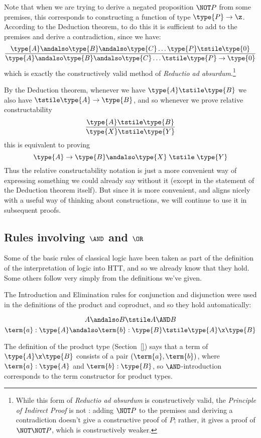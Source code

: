 Note that when we are trying to derive a negated proposition $\NOT P$ from some premises, this corresponds to constructing a function of type $\type{P} \to \z$.  According to the Deduction theorem, to do this it is sufficient to add  to the premises and derive a contradiction, since we have:
\[
\frac
{\type{A}\andalso \type{B}\andalso \type{C} \ldots \type{P} \tstile \type{0}
}
{\type{A}\andalso \type{B}\andalso \type{C} \ldots \tstile \type{P} \to \type{0}
}
\]
which is exactly the constructively valid method of \emph{Reductio ad absurdum}.\footnote{
While this form of \emph{Reductio ad absurdum} is constructively valid,  the \emph{Principle of Indirect Proof} is not
: adding $\NOT P$ to the premises and deriving a contradiction doesn't give a constructive proof of $P$; rather, it gives a proof of $\NOT \NOT P$, which is constructively weaker.
}

By the Deduction theorem, whenever we have 
$\type{A} \tstile \type{B}$ 
we also have 
$\tstile \type{A} \to \type{B}$, and so whenever we prove relative constructability
\[
\frac{\type{A} \tstile \type{B}}
{\type{X} \tstile \type{Y}}
\]
this is equivalent to proving
\[
\type{A} \to \type{B}\andalso \type{X} 
\;\tstile\; 
\type{Y}
\]
Thus the relative constructability notation is just a more convenient way of expressing something we could already say without it (except in the statement of the Deduction theorem itself).  But since it is more convenient, and aligns nicely with a useful way of thinking about constructions, we will continue to use it in subsequent proofs.



\newpage
\subsection{Rules involving $\AND$ and $\OR$}
\label{sec:DoingLogic-ANDORrules}

Some of the basic rules of classical logic have been taken as part of the definition of the interpretation of logic into HTT, and so we already know that they hold.  Some others follow very simply from the definitions we've given.




The Introduction and Elimination rules for conjunction and disjunction were used in the definitions of the product and coproduct, and so they hold automatically:

\begin{Theorem}
\[
A\andalso B \tstile A \AND B 
\]
\[
\term{a}:\type{A}\andalso 
\term{b}:\type{B} 
\tstile 
\type{A} \x \type{B} 
\]\end{Theorem}
\begin{Proof}
The definition of the product type (Section~\ref{}) says that a term of $\type{A} \x \type{B}$ consists of a pair $(\term{a}, \term{b})$, where $\term{a}:\type{A}$
and
$\term{b}:\type{B}$, so $\AND$-introduction corresponds to the term constructor for product types.
\end{Proof}

